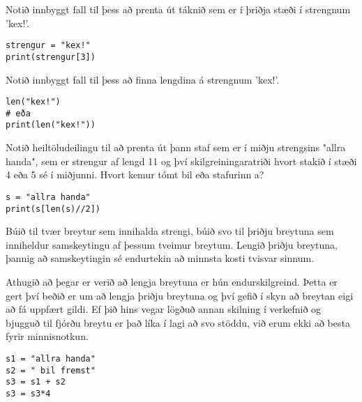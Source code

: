\begin{exercise}\label{str4}
	Notið innbyggt fall til þess að prenta út táknið sem er í þriðja stæði í strengnum 'kex!'.
\end{exercise}
\begin{Answer}[ref={str4}]
\begin{lstlisting}
strengur = "kex!"
print(strengur[3])\end{lstlisting}
\end{Answer}

\begin{exercise}\label{str4-5}
	Notið innbyggt fall til þess að finna lengdina á strengnum 'kex!'.
\end{exercise}
\begin{Answer}[ref={str4-5}]
\begin{lstlisting}
len("kex!")
# eða
print(len("kex!"))\end{lstlisting}
\end{Answer}

\begin{exercise}\label{str5}
	Notið heiltöludeilingu til að prenta út þann staf sem er í miðju strengsins "allra handa", sem er strengur af lengd 11 og því skilgreiningaratriði hvort stakið í stæði 4 eða 5 sé í miðjunni.
	Hvort kemur tómt bil eða stafurinn a?
\end{exercise}
\begin{Answer}[ref={str5}]
\begin{lstlisting}
s = "allra handa"
print(s[len(s)//2])\end{lstlisting}
\newpage
\end{Answer}

\begin{exercise}\label{str6}
	Búið til tvær breytur sem innihalda strengi, búið svo til þriðju breytuna sem inniheldur samskeytingu af þessum tveimur breytum.
	Lengið þriðju breytuna, þannig að samskeytingin sé endurtekin að minnsta kosti tvisvar sinnum.
\end{exercise}
\begin{Answer}[ref={str6}]
	Athugið að þegar er verið að lengja breytuna er hún endurskilgreind.
	Þetta er gert því beðið er um að lengja þriðju breytuna og því gefið í skyn að breytan eigi að fá uppfært gildi.
	Ef þið hins vegar lögðuð annan skilning í verkefnið og bjugguð til fjórðu breytu er það líka í lagi að svo stöddu, við erum ekki að besta fyrir minnisnotkun.
\begin{lstlisting}
s1 = "allra handa"
s2 = " bil fremst"
s3 = s1 + s2
s3 = s3*4\end{lstlisting}
\end{Answer}

